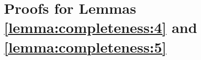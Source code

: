 \section{Proofs for Lemmas \ref{lemma:completeness:4} and \ref{lemma:completeness:5}}\label{app:completeness:proofs}

